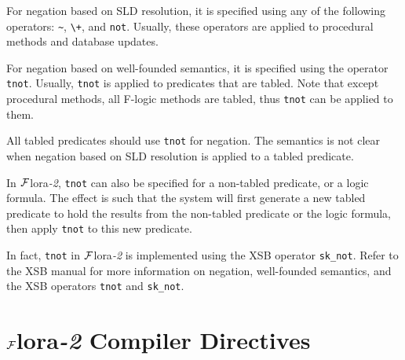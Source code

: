 \documentclass[11pt]{article}
\newcommand{\FLORA}{{\mbox{${\cal F}${\sc lora}\rm\emph{-2}}}\xspace}
\newcommand{\fl}{\mbox{F-logic}\xspace}
\begin{document}
For negation based on SLD resolution, it is specified using any of the
following operators: \verb|~|, \verb|\+|, and {\tt not}. Usually, these
operators are applied to procedural methods and database updates.

For negation based on well-founded semantics, it is specified using the
operator {\tt tnot}. Usually, {\tt tnot} is applied to predicates that
are tabled. Note that except procedural methods, all \fl methods are
tabled, thus {\tt tnot} can be applied to them.

All tabled predicates should use {\tt tnot} for negation. The
semantics is not clear when negation based on SLD resolution is
applied to a tabled predicate.

In \FLORA, {\tt tnot} can also be specified for a non-tabled
predicate, or a logic formula. The effect is such that the system will
first generate a new tabled predicate to hold the results from the
non-tabled predicate or the logic formula, then apply {\tt tnot} to
this new predicate.

In fact, {\tt tnot} in \FLORA is implemented using the XSB operator
\verb|sk_not|. Refer to the XSB manual for more information on
negation, well-founded semantics, and the XSB operators {\tt tnot} and
\verb|sk_not|.


\section{\FLORA Compiler Directives} \label{sec-comp-directives}
\end{document}
